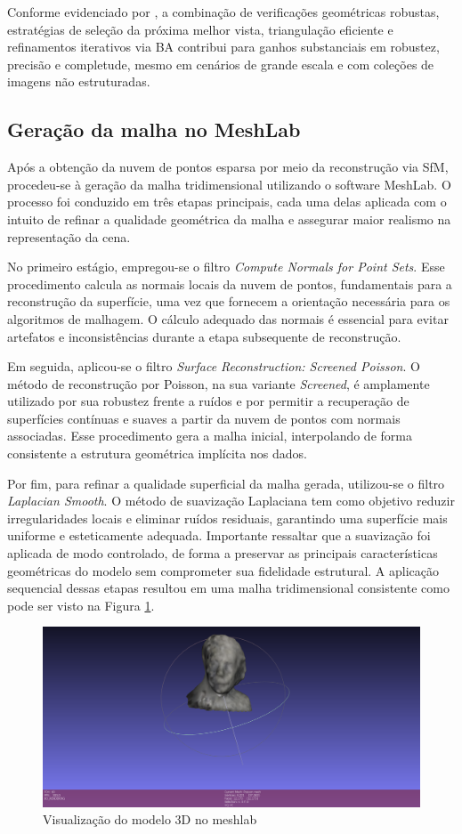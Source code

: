 \documentclass[12pt]{article}
\begin{document}
Conforme evidenciado por \cite{schoenberger2016sfm}, a combinação de verificações geométricas robustas, estratégias de seleção da próxima melhor vista, triangulação eficiente e refinamentos iterativos via BA contribui para ganhos substanciais em robustez, precisão e completude, mesmo em cenários de grande escala e com coleções de imagens não estruturadas.

\subsection{Geração da malha no MeshLab}

Após a obtenção da nuvem de pontos esparsa por meio da reconstrução via SfM, procedeu-se à geração da malha tridimensional utilizando o software MeshLab. O processo foi conduzido em três etapas principais, cada uma delas aplicada com o intuito de refinar a qualidade geométrica da malha e assegurar maior realismo na representação da cena.

No primeiro estágio, empregou-se o filtro \textit{Compute Normals for Point Sets}. Esse procedimento calcula as normais locais da nuvem de pontos, fundamentais para a reconstrução da superfície, uma vez que fornecem a orientação necessária para os algoritmos de malhagem. O cálculo adequado das normais é essencial para evitar artefatos e inconsistências durante a etapa subsequente de reconstrução.

Em seguida, aplicou-se o filtro \textit{Surface Reconstruction: Screened Poisson}. O método de reconstrução por Poisson, na sua variante \textit{Screened}, é amplamente utilizado por sua robustez frente a ruídos e por permitir a recuperação de superfícies contínuas e suaves a partir da nuvem de pontos com normais associadas. Esse procedimento gera a malha inicial, interpolando de forma consistente a estrutura geométrica implícita nos dados.

Por fim, para refinar a qualidade superficial da malha gerada, utilizou-se o filtro \textit{Laplacian Smooth}. O método de suavização Laplaciana tem como objetivo reduzir irregularidades locais e eliminar ruídos residuais, garantindo uma superfície mais uniforme e esteticamente adequada. Importante ressaltar que a suavização foi aplicada de modo controlado, de forma a preservar as principais características geométricas do modelo sem comprometer sua fidelidade estrutural. A aplicação sequencial dessas etapas resultou em uma malha tridimensional consistente como pode ser visto na Figura \ref{fig:model}.

\begin{figure}[H]
    \centering
    \includegraphics[width=.5\textwidth]{images/modelo_3d.png}
    \caption{Visualização do modelo 3D no meshlab}
    \label{fig:model}
\end{figure}
\end{document}
